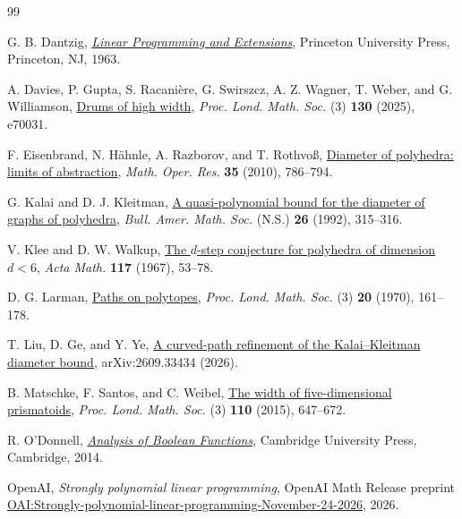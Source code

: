 \begin{thebibliography}{99}
\small

G. B. Dantzig,
\emph{\href{https://press.princeton.edu/books/paperback/9780691059136/linear-programming-and-extensions}{Linear Programming and Extensions}},
Princeton University Press, Princeton, NJ, 1963.

A. Davies, P. Gupta, S. Racanière, G. Swirszcz, A. Z. Wagner,
T. Weber, and G. Williamson,
\href{https://doi.org/10.1112/plms.70031}{Drums of high width},
\emph{Proc. Lond. Math. Soc.} (3) \textbf{130} (2025), e70031.

F. Eisenbrand, N. H\"ahnle, A. Razborov, and T. Rothvo\ss,
\href{https://doi.org/10.1287/moor.1100.0470}{Diameter of polyhedra: limits of abstraction},
\emph{Math. Oper. Res.} \textbf{35} (2010), 786--794.

G. Kalai and D. J. Kleitman,
\href{https://doi.org/10.1090/S0273-0979-1992-00285-9}{A quasi-polynomial bound for the diameter of graphs of polyhedra},
\emph{Bull. Amer. Math. Soc.} (N.S.) \textbf{26} (1992), 315--316.

V. Klee and D. W. Walkup,
\href{https://doi.org/10.1007/BF02395040}{The $d$-step conjecture for polyhedra of dimension $d<6$},
\emph{Acta Math.} \textbf{117} (1967), 53--78.

D. G. Larman,
\href{https://doi.org/10.1112/plms/s3-20.1.161}{Paths on polytopes},
\emph{Proc. Lond. Math. Soc.} (3) \textbf{20} (1970), 161--178.

T. Liu, D. Ge, and Y. Ye,
\href{https://arxiv.org/abs/2609.33434}{A curved-path refinement of the Kalai--Kleitman diameter bound},
arXiv:2609.33434 (2026).

B. Matschke, F. Santos, and C. Weibel,
\href{https://doi.org/10.1112/plms/pdu064}{The width of five-dimensional prismatoids},
\emph{Proc. Lond. Math. Soc.} (3) \textbf{110} (2015), 647--672.

R. O'Donnell,
\emph{\href{https://doi.org/10.1017/CBO9781139814782}{Analysis of Boolean Functions}},
Cambridge University Press, Cambridge, 2014.

OpenAI, \emph{Strongly polynomial linear programming},
OpenAI Math Release preprint
\href{https://github.com/openai/math/blob/main/preprints/Strongly-polynomial-linear-programming-November-24-2026/paper.pdf}{{\ttfamily OAI:Strongly-\allowbreak{}polynomial-\allowbreak{}linear-\allowbreak{}programming-\allowbreak{}November-\allowbreak{}24-\allowbreak{}2026}}, 2026.


\end{thebibliography}
